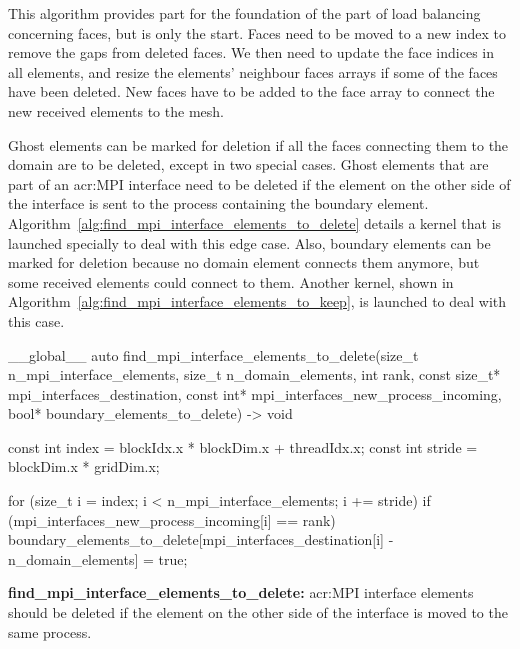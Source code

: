 This algorithm provides part for the foundation of the part of load balancing concerning faces, but
is only the start. Faces need to be moved to a new index to remove the gaps from deleted faces. We
then need to update the face indices in all elements, and resize the elements' neighbour faces
arrays if some of the faces have been deleted. New faces have to be added to the face array to
connect the new received elements to the mesh.

Ghost elements can be marked for deletion if all the faces connecting them to the domain are to be
deleted, except in two special cases. Ghost elements that are part of an \acrshort{acr:MPI}
interface need to be deleted if the element on the other side of the interface is sent to the
process containing the boundary element. Algorithm~\ref{alg:find_mpi_interface_elements_to_delete}
details a kernel that is launched specially to deal with this edge case. Also, boundary elements can
be marked for deletion because no domain element connects them anymore, but some received elements
could connect to them. Another kernel, shown in
Algorithm~\ref{alg:find_mpi_interface_elements_to_keep}, is launched to deal with this case.

\begin{algorithm}[H]
    \begin{cuda}
        __global__
        auto find_mpi_interface_elements_to_delete(size_t n_mpi_interface_elements, 
                size_t n_domain_elements, int rank, 
                const size_t* mpi_interfaces_destination, 
                const int* mpi_interfaces_new_process_incoming, 
                bool* boundary_elements_to_delete) -> void {

            const int index = blockIdx.x * blockDim.x + threadIdx.x;
            const int stride = blockDim.x * gridDim.x;

            for (size_t i = index; i < n_mpi_interface_elements; i += stride) {
                if (mpi_interfaces_new_process_incoming[i] == rank) {
                    boundary_elements_to_delete[mpi_interfaces_destination[i] 
                                              - n_domain_elements] = true;
                }
            }
        }\end{cuda}
\caption{\textbf{find\_mpi\_interface\_elements\_to\_delete:} \Acrshort{acr:MPI} interface elements should be deleted if the element on the other side of the interface is moved to the same process.}\label{alg:find_mpi_interface_elements_to_delete}
\end{algorithm}

